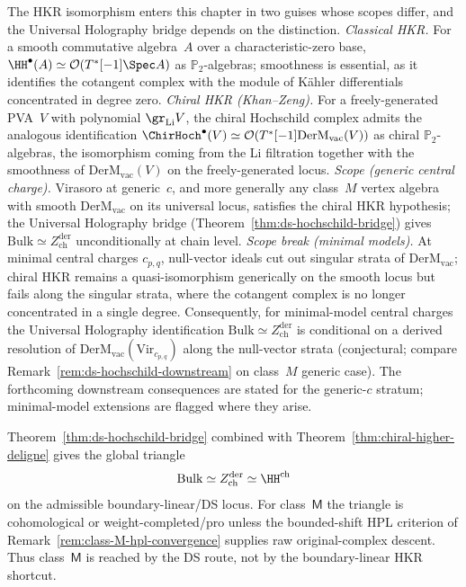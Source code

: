 \begin{remark}%
\label{rem:hkr-scope-and-chiral-analogue}%
%
%
The HKR isomorphism enters this chapter in two guises whose scopes
differ, and the Universal Holography bridge depends on the distinction.
\emph{Classical HKR.} For a smooth commutative algebra~$A$ over a
characteristic-zero base,
$\HH^{\bullet}(A)\simeq\mathcal{O}(T^*[-1]\Spec A)$
as $\mathbb{P}_2$-algebras; smoothness is essential, as it identifies
the cotangent complex with the module of K\"ahler differentials
concentrated in degree zero.
\emph{Chiral HKR (Khan--Zeng).} For a freely-generated PVA~$V$ with
polynomial $\gr_{\mathrm{Li}}V$, the chiral Hochschild complex admits
the analogous identification
$\ChirHoch^{\bullet}(V)\simeq
 \mathcal{O}(T^*[-1]\mathrm{DerM}_{\mathrm{vac}}(V))$
as chiral $\mathbb{P}_2$-algebras, the isomorphism coming from the
Li filtration together with the smoothness of $\mathrm{DerM}_{\mathrm{vac}}(V)$
on the freely-generated locus.
\emph{Scope (generic central charge).} Virasoro at generic~$c$, and
more generally any class~$M$ vertex algebra with smooth
$\mathrm{DerM}_{\mathrm{vac}}$ on its universal locus, satisfies the
chiral HKR hypothesis; the Universal Holography bridge
(Theorem~\ref{thm:ds-hochschild-bridge}) gives
$\mathrm{Bulk}\simeq Z^{\mathrm{der}}_{\mathrm{ch}}$ unconditionally
at chain level.
\emph{Scope break (minimal models).} At minimal central charges
$c_{p,q}$, null-vector ideals cut out singular strata of
$\mathrm{DerM}_{\mathrm{vac}}$; chiral HKR remains a quasi-isomorphism
generically on the smooth locus but fails along the singular strata,
where the cotangent complex is no longer concentrated in a single
degree. Consequently, for minimal-model central charges the Universal
Holography identification $\mathrm{Bulk}\simeq Z^{\mathrm{der}}_{\mathrm{ch}}$
is conditional on a derived resolution of
$\mathrm{DerM}_{\mathrm{vac}}(\mathrm{Vir}_{c_{p,q}})$ along the
null-vector strata (conjectural; compare
Remark~\ref{rem:ds-hochschild-downstream} on class~$M$ generic case).
The forthcoming downstream consequences are stated for the generic-$c$
stratum; minimal-model extensions are flagged where they arise.
\end{remark}

\begin{remark}%
\label{rem:ds-hochschild-downstream}%
Theorem~\ref{thm:ds-hochschild-bridge} combined with
Theorem~\ref{thm:chiral-higher-deligne} gives the global triangle
\[
\mathrm{Bulk}\simeq Z^{\mathrm{der}}_{\mathrm{ch}}\simeq
\HH^{\mathrm{ch}}
\]
on the admissible boundary-linear/DS locus. For class~$\mathsf M$ the
triangle is cohomological or weight-completed/pro unless the
bounded-shift HPL criterion of
Remark~\ref{rem:class-M-hpl-convergence} supplies raw original-complex
descent. Thus class~$\mathsf M$ is reached by the DS route, not by the
boundary-linear HKR shortcut.
\end{remark}

